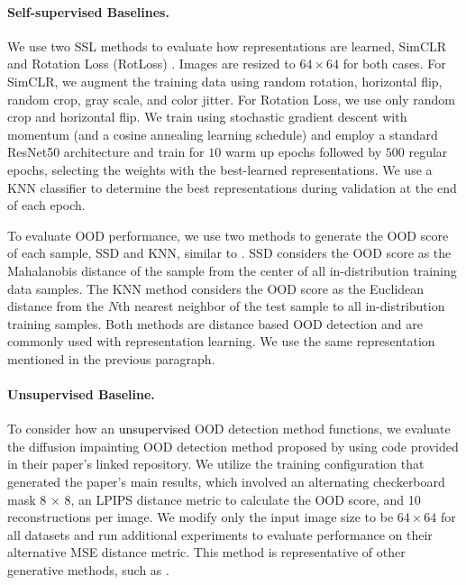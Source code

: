 \documentclass{article} %
\theoremstyle{plain}
\theoremstyle{definition}
\theoremstyle{remark}
\begin{document}
\vspace{-2mm}\paragraph{Self-supervised Baselines.}

We use two SSL methods to evaluate how representations are learned, SimCLR \citep{chen2020simple} and Rotation Loss (RotLoss) \citep{hendrycks2019using}. Images are resized to $64\times64$ for both cases. For SimCLR, we augment the training data using random rotation, horizontal flip, random crop, gray scale, and color jitter. For Rotation Loss, we use only random crop and horizontal flip.  We train using stochastic gradient descent with momentum (and a cosine annealing learning schedule) and employ a standard ResNet50 architecture and train for $10$ warm up epochs followed by $500$ regular epochs, selecting the weights with the best-learned representations. We use a KNN classifier to determine the best representations during validation at the end of each epoch.

To evaluate OOD performance, we use two methods to generate the OOD score of each sample, SSD \citep{sehwag2021ssd} and KNN, similar to \citep{sun2022out}. SSD considers the OOD score as the Mahalanobis distance of the sample from the center of all in-distribution training data samples. The KNN method considers the OOD score as the Euclidean distance from the $N$th nearest neighbor of the test sample to all in-distribution training samples. Both methods are distance based OOD detection and are commonly used with representation learning. We use the same representation mentioned in the previous paragraph. 

\vspace{-2mm}\paragraph{Unsupervised Baseline.}

To consider how an \textcolor{black}{unsupervised} OOD detection method functions, we evaluate the diffusion impainting OOD detection method proposed by \citep{liu2023unsupervised} using code provided in their paper's linked repository.  We utilize the training configuration that generated the paper's main results, which involved an alternating checkerboard mask 8 × 8, an LPIPS distance metric to calculate the OOD score, and 10 reconstructions per image. We modify only the input image size to be $64\times64$ for all datasets and run additional experiments to evaluate performance on their alternative MSE distance metric. This method is representative of other generative methods, such as \cite{xiao2020likelihood}.
\end{document}
